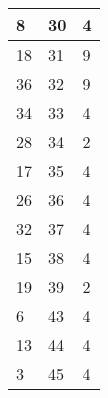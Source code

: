 \begin{longtable}{|l|l|l|}
8 & 30 & 4 \\ \hline 
18 & 31 & 9 \\ \hline 
36 & 32 & 9 \\ \hline 
34 & 33 & 4 \\ \hline 
28 & 34 & 2 \\ \hline 
17 & 35 & 4 \\ \hline 
26 & 36 & 4 \\ \hline 
32 & 37 & 4 \\ \hline 
15 & 38 & 4 \\ \hline 
19 & 39 & 2 \\ \hline 
6 & 43 & 4 \\ \hline 
13 & 44 & 4 \\ \hline 
3 & 45 & 4 \\ \hline 
 \end{longtable}

